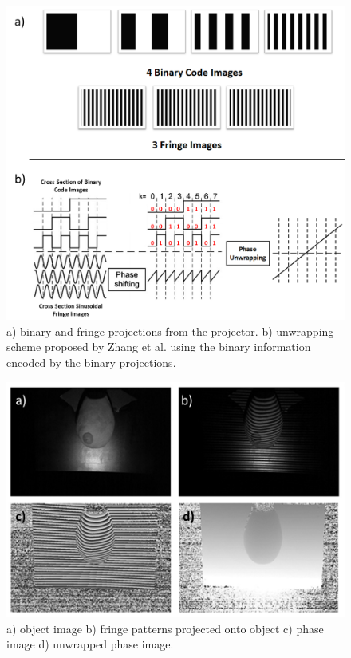 \begin{figure}[ht]
\begin{center}
\includegraphics[width=14cm]{./figures/4_Gen3/profunwrap.png}
\caption{a) binary and fringe projections from the projector. b) unwrapping scheme proposed by Zhang et al. using the binary information encoded by the binary projections.}
\label{fig:profunwrap}
\end{center}
\end{figure}
\begin{figure}[ht]
\begin{center}
\includegraphics[width=14cm]{./figures/4_Gen3/proffringe.png}
\caption{a) object image b) fringe patterns projected onto object c) phase image d) unwrapped phase image.}
\label{fig:proffringe}
\end{center}
\end{figure}


